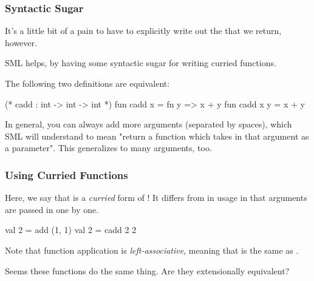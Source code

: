 \documentclass[aspectratio=169]{beamer}
\begin{document}
\begin{frame}[fragile]
  \frametitle{Syntactic Sugar}

  It's a little bit of a pain to have to explicitly write out the 
  that we return, however.

  \pause
  \vspace{\fill}

  SML helps, by having some syntactic sugar for writing curried functions.

  \pause
  \vspace{\fill}

  The following two definitions are equivalent:
  \begin{codeblock}
    (* cadd : int -> int -> int *)
    fun cadd x = fn y => x + y
    fun cadd x y = x + y
  \end{codeblock}

  \pause
  \vspace{\fill}

  In general, you can always add more arguments (separated by spaces), which SML will
  understand to mean "return a function which takes in that argument as a parameter".
  This generalizes to many arguments, too.
\end{frame}

\begin{frame}[fragile]
  \frametitle{Using Curried Functions}

  Here, we say that  is a \textit{curried} form of !
  It differs from  in usage in that arguments are passed in one by one.

  \pause
  \vspace{\fill}

  \begin{codeblock}
    val 2 = add (1, 1)
    val 2 = cadd 2 2
  \end{codeblock}

  \pause
  \vspace{\fill}

  Note that function application is \textit{left-associative}, meaning that
   is the same as .

  \pause
  \vspace{\fill}

  Seems these functions do the same thing. Are they extensionally equivalent?
\end{frame}
\end{document}
